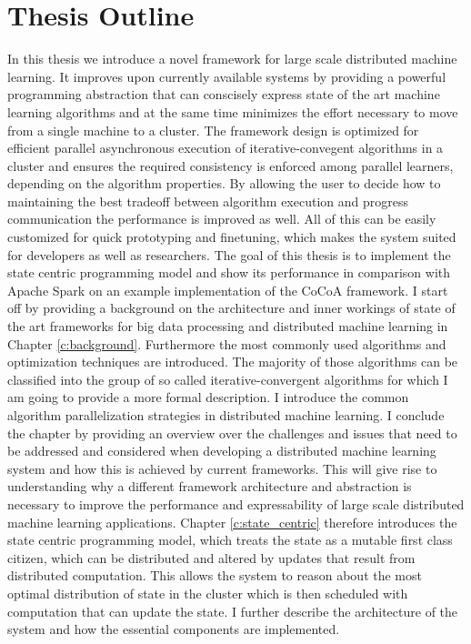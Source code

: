 \section{Thesis Outline}
In this thesis we introduce a novel framework for large scale distributed machine learning.
It improves upon currently available systems by providing a powerful programming abstraction that can conscisely express state of the art machine learning algorithms and at the same time minimizes the effort necessary to move from a single machine to a cluster.
The framework design is optimized for efficient parallel asynchronous execution of iterative-convegent algorithms in a cluster and ensures the required consistency is enforced among parallel learners, depending on the algorithm properties. By allowing the user to decide how to maintaining the best tradeoff between algorithm execution and progress communication the performance is improved as well.
All of this can be easily customized for quick prototyping and finetuning, which makes the system suited for developers as well as researchers.
The goal of this thesis is to implement the state centric programming model and show its performance in comparison with Apache Spark on an example implementation of the CoCoA \cite{Jaggi2014} framework.
I start off by providing a background on the architecture and inner workings of state of the art frameworks for big data processing and distributed machine learning in Chapter \ref{c:background}. Furthermore the most commonly used algorithms and optimization techniques are introduced.
The majority of those algorithms can be classified into the group of so called iterative-convergent algorithms for which I am going to provide a more formal description. I introduce the common algorithm parallelization strategies in distributed machine learning.
I conclude the chapter by providing an overview over the challenges and issues that need to be addressed and considered when developing a distributed machine learning system and how this is achieved by current frameworks.
This will give rise to understanding why a different framework architecture and abstraction is necessary to improve the performance and expressability of large scale distributed machine learning applications.
Chapter \ref{c:state_centric} therefore introduces the state centric programming model, which treats the state as a mutable first class citizen, which can be distributed and altered by updates that result from distributed computation.
This allows the system to reason about the most optimal distribution of state in the cluster which is then scheduled with computation that can update the state. I further describe the architecture of the system and how the essential components are implemented.
